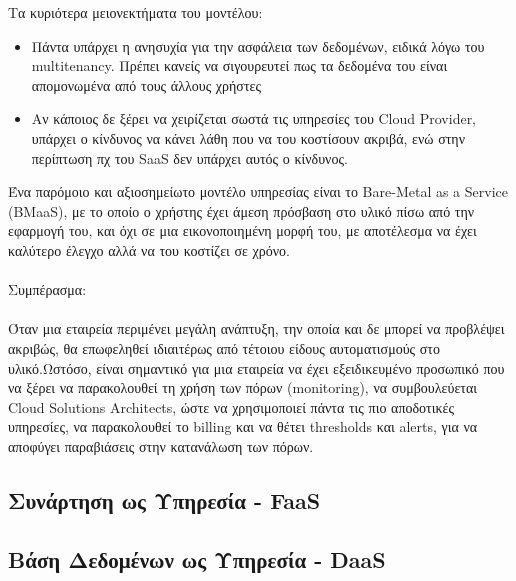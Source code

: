 \documentclass{article}
\begin{document}
 Τα κυριότερα μειονεκτήματα του μοντέλου:
\begin{itemize}
\item Πάντα υπάρχει η ανησυχία για την ασφάλεια των δεδομένων, ειδικά λόγω
του multitenancy. Πρέπει
κανείς να σιγουρευτεί πως τα δεδομένα του είναι απομονωμένα από τους
άλλους χρήστες
\item Αν κάποιος δε ξέρει να χειρίζεται σωστά τις υπηρεσίες του
Cloud Provider, υπάρχει ο
κίνδυνος να κάνει λάθη που να του κοστίσουν ακριβά, ενώ στην περίπτωση πχ
του SaaS δεν υπάρχει αυτός ο
κίνδυνος.
\end{itemize}
Ένα παρόμοιο και αξιοσημείωτο μοντέλο υπηρεσίας είναι
το Bare-Metal as a Service
(BMaaS), με το οποίο ο χρήστης έχει άμεση πρόσβαση
στο υλικό πίσω από την εφαρμογή του, και όχι σε μια εικονοποιημένη μορφή
του, με αποτέλεσμα να έχει καλύτερο έλεγχο αλλά να του κοστίζει σε χρόνο.
\\ \\
Συμπέρασμα: \\ \\
Όταν μια εταιρεία περιμένει μεγάλη ανάπτυξη, την οποία και δε μπορεί να
προβλέψει ακριβώς, θα επωφεληθεί ιδιαιτέρως από τέτοιου είδους
αυτοματισμούς στο υλικό.Ωστόσο, είναι σημαντικό για μια εταιρεία να έχει
εξειδικευμένο προσωπικό που να ξέρει να παρακολουθεί τη χρήση των πόρων
(monitoring), να
συμβουλεύεται Cloud Solutions
Architects, ώστε να χρησιμοποιεί πάντα τις πιο
αποδοτικές υπηρεσίες, να παρακολουθεί το billing
και να θέτει thresholds
και alerts,
για να αποφύγει παραβιάσεις στην κατανάλωση των
πόρων.


\subsection{Συνάρτηση ως Υπηρεσία -
FaaS}

\subsection{Βάση Δεδομένων ως Υπηρεσία -
DaaS}
\end{document}
